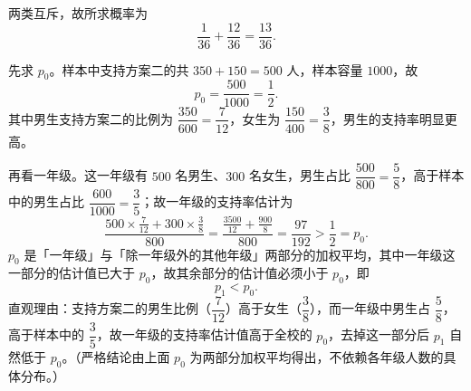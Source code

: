 \begin{answer}
两类互斥，故所求概率为
\nopagebreak[4]
\[\frac1{36}+\frac{12}{36}=\frac{13}{36} .\]


先求 $p_0$。样本中支持方案二的共 $350+150=500$ 人，样本容量 $1000$，故
\nopagebreak[4]
\[p_0=\frac{500}{1000}=\frac12 .\]
其中男生支持方案二的比例为 $\dfrac{350}{600}=\dfrac7{12}$，女生为 $\dfrac{150}{400}=\dfrac38$，男生的支持率明显更高。

再看一年级。这一年级有 $500$ 名男生、$300$ 名女生，男生占比 $\dfrac{500}{800}=\dfrac58$，高于样本中的男生占比 $\dfrac{600}{1000}=\dfrac35$；故一年级的支持率估计为
\nopagebreak[4]
\[\frac{500\times\frac7{12}+300\times\frac38}{800}=\frac{\frac{3500}{12}+\frac{900}8}{800}=\frac{97}{192}>\frac12=p_0 .\]
$p_0$ 是「一年级」与「除一年级外的其他年级」两部分的加权平均，其中一年级这一部分的估计值已大于 $p_0$，故其余部分的估计值必须小于 $p_0$，即
\nopagebreak[4]
\[p_1<p_0 .\]
直观理由：支持方案二的男生比例（$\dfrac7{12}$）高于女生（$\dfrac38$），而一年级中男生占 $\dfrac58$，高于样本中的 $\dfrac35$，故一年级的支持率估计值高于全校的 $p_0$，去掉这一部分后 $p_1$ 自然低于 $p_0$。（严格结论由上面 $p_0$ 为两部分加权平均得出，不依赖各年级人数的具体分布。）




\end{answer}
